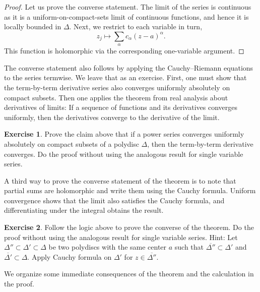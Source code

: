 \documentclass[12pt,openany]{book}
\theoremstyle{plain}
\theoremstyle{remark}
\theoremstyle{definition}
\newenvironment{exbox}{%
    \def\FrameCommand{\vrule width 1pt \relax\hspace{10pt}}%
    \MakeFramed {\advance \hsize -\width \FrameRestore}%
}{%
    \endMakeFramed
}
\theoremstyle{exercise}
\newtheorem{exercise}{Exercise}[section]
\theoremstyle{example}
\begin{document}
\begin{proof}
Let us prove the converse statement.
The limit of the series
is continuous as it is a uniform-on-compact-sets limit of continuous
functions, and hence it is locally bounded in $\Delta$.  Next,
we restrict to each variable in turn, 
\begin{equation*}
z_j \mapsto \sum_{\alpha} c_\alpha {(z-a)}^\alpha .
\end{equation*}
This function is holomorphic via the corresponding one-variable argument.
\end{proof}

The converse statement also follows by applying the Cauchy--Riemann
equations to the series termwise.
We leave that as an exercise.
First, one must show that the term-by-term derivative
series also converges uniformly absolutely on compact subsets.
Then one applies the theorem from real analysis about derivatives
of limits: If a sequence of functions and its derivatives converges
uniformly, then the derivatives converge to the derivative of the limit.

\begin{exbox}
\begin{exercise}
Prove the claim above that if a power series converges uniformly absolutely
on compact subsets of a polydisc $\Delta$, then the term-by-term derivative
converges.
Do the proof without using the analogous result for single variable series.
\end{exercise}
\end{exbox}

A third way to prove the converse statement of the theorem
is to note that partial sums are
holomorphic and write them using the Cauchy formula.  Uniform
convergence shows that the limit also satisfies the Cauchy formula, and
differentiating under the integral obtains the result.

\begin{exbox}
\begin{exercise}
Follow the logic above to prove the converse of the
theorem.
Do the proof without using the analogous result for single variable series.
Hint:
Let
$\Delta'' \subset \Delta' \subset \Delta$
be two polydiscs with the same center $a$
such that $\overline{\Delta''} \subset \Delta'$
and $\overline{\Delta'} \subset \Delta$.
Apply Cauchy formula on $\Delta'$
for $z \in \overline{\Delta''}$.
\end{exercise}
\end{exbox}

We organize some immediate consequences of the theorem
and the calculation in the proof.
\end{document}
